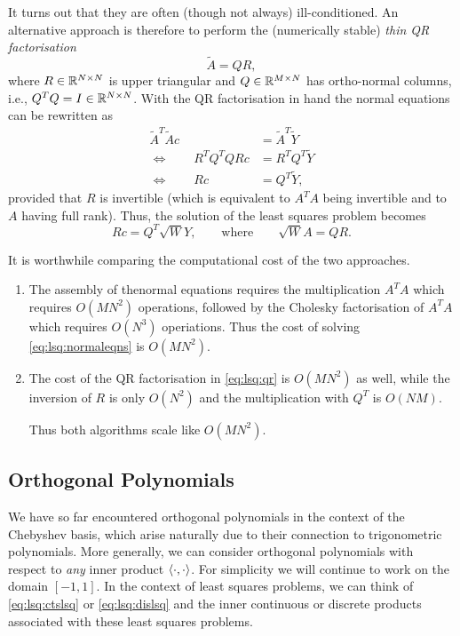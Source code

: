 It turns out that they are often (though not always) ill-conditioned.
An alternative approach is therefore to perform the (numerically stable)
{\em thin QR factorisation}
\[
    \tilde{A} = Q R,
\]
where $R \in \mathbb{R}^{N \times N}$ is upper triangular and  $Q \in \mathbb{R}^{M \times N}$
has ortho-normal columns, i.e., $Q^T Q = I \in \mathbb{R}^{N \times N}$.
With the QR factorisation in hand the normal equations can be rewritten as
\begin{align*}
    \tilde{A}^T\tilde{A} c &= \tilde{A}^T \tilde{Y} \\
    \Leftrightarrow \qquad
    R^T Q^T Q R c &= R^T Q^T \tilde{Y} \\
    \Leftrightarrow \qquad
    R c &= Q^T \tilde{Y},
\end{align*}
provided that $R$ is invertible (which is equivalent to $A^T A$ being invertible
and to $A$ having full rank). Thus, the solution of the least squares problem
becomes
\begin{equation}
    \label{eq:lsq:qr}
    R c = Q^T \sqrt{W} Y, \qquad \text{where} \qquad
    \sqrt{W} A = QR.
\end{equation}

It is worthwhile comparing the computational cost of the two approaches.
\begin{enumerate}
\item The assembly of thenormal equations requires the multiplication
$A^T A$ which requires $O(M N^2)$ operations, followed by  the
Cholesky factorisation of $A^T A$ which requires $O(N^3)$ operiations.
Thus the cost of solving \eqref{eq:lsq:normaleqns} is $O(M N^2)$.
\item The cost of the QR factorisation in \eqref{eq:lsq:qr} is
$O(M N^2)$ as well, while the inversion of $R$ is only $O(N^2)$ and the
multiplication with $Q^T$ is $O(NM)$.

Thus both algorithms scale like $O(M N^2)$.
\end{enumerate}


\subsection{Orthogonal Polynomials}
%
\label{sec:lsq:orthpolys}
%
We have so far encountered orthogonal polynomials in the context of the
Chebyshev basis, which arise naturally due to their connection to trigonometric
polynomials. More generally, we can consider orthogonal polynomials with respect
to {\em any} inner product $\langle\cdot, \cdot\rangle$. For simplicity we will continue
to work on the domain $[-1, 1]$. In the context of least squares problems, we
can think of \eqref{eq:lsq:ctslsq} or \eqref{eq:lsq:dislsq} and the inner
continuous or discrete products associated with these least squares problems.

